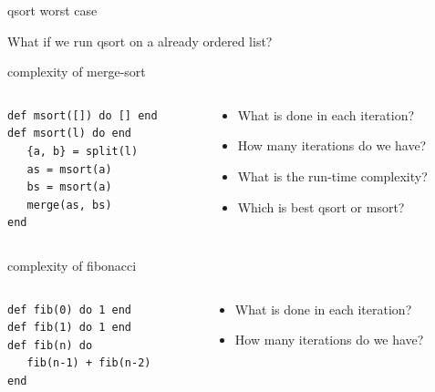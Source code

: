 \begin{frame}{qsort worst case}

What if we run qsort on a already ordered list?

\end{frame}


\begin{frame}[fragile]{complexity of merge-sort}

\begin{columns}
   \begin{column}{.6\linewidth}
    \begin{verbatim}
def msort([]) do [] end
def msort(l) do end
   {a, b} = split(l)
   as = msort(a)
   bs = msort(a)
   merge(as, bs)
end
   \end{verbatim}
   \end{column}
   \begin{column}{.4\linewidth}
    \begin{itemize}
      \pause \item What is done in each iteration?
      \pause \item How many iterations do we have?       
      \pause \item What is the run-time complexity?       
      \pause \item Which is best qsort or msort?       
    \end{itemize}
   \end{column}
\end{columns}

\end{frame}

\begin{frame}[fragile]{complexity of fibonacci}

\begin{columns}
   \begin{column}{.6\linewidth}
    \begin{verbatim}
def fib(0) do 1 end
def fib(1) do 1 end
def fib(n) do 
   fib(n-1) + fib(n-2)
end
    \end{verbatim}
   \end{column}
   \begin{column}{.4\linewidth}
    \begin{itemize}
      \pause \item What is done in each iteration?
      \pause \item How many iterations do we have?       
    \end{itemize}
   \end{column}
\end{columns}

\end{frame}


